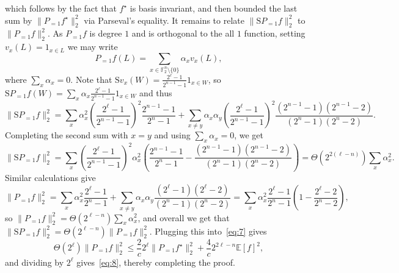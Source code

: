 \documentclass[11pt]{article}
\newcommand\E{\mathbb{E}}
\newcommand\norm[1]{\| #1 \|}
\renewcommand\leq{\leqslant}
\begin{document}
  which follows by the fact that $f^{\star}$ is basis invariant, and then bounded the last sum by $\norm{P_{=1}f^{\star}}_2^2$ via Parseval's equality. It remains to relate 
  $\norm{\mathrm{S} P_{=1} f}_2^2$ to 
  $\norm{P_{=1} f}_2^2$. As $P_{=1} f$ is degree $1$ and is orthogonal to the all $1$ function, setting $v_x(L) = 1_{x\in L}$ we may write
  \[
    P_{=1}f(L) = \sum\limits_{x\in\mathbb{F}_2^n\setminus\{0\}}\alpha_x v_x(L),
  \]
  where $\sum\limits_{x}\alpha_x=0$. Note that $\mathrm{S} v_x(W) = \frac{2^{\ell}-1}{2^{n-1}-1}1_{x\in W}$, so
  $\mathrm{S} P_{=1}f(W) = \sum\limits_{x} \alpha_x\frac{2^{\ell}-1}{2^{n-1}-1}1_{x\in W}$ and thus
  \[
  \norm{\mathrm{S} P_{=1}f}_2^2
  =\sum\limits_{x}\alpha_x^2\left(\frac{2^{\ell}-1}{2^{n-1}-1}\right)^2\frac{2^{n-1}-1}{2^{n}-1}
  +\sum\limits_{x\neq y}
  \alpha_x\alpha_y
  \left(\frac{2^{\ell}-1}{2^{n-1}-1}\right)^2\frac{(2^{n-1}-1)(2^{n-1}-2)}{(2^{n}-1)(2^n-2)}.
  \]
  Completing the second sum with $x=y$ and using $\sum_{x}\alpha_x=0$, we get
  \[
  \norm{\mathrm{S} P_{=1}f}_2^2
  =\sum\limits_{x}\left(\frac{2^{\ell}-1}{2^{n-1}-1}\right)^2\alpha_x^2
  \left(\frac{2^{n-1}-1}{2^{n}-1}
  -
  \frac{(2^{n-1}-1)(2^{n-1}-2)}{(2^{n}-1)(2^n-2)}\right)
  =\Theta(2^{2(\ell-n)})
  \sum\limits_{x}\alpha_x^2.
  \]
  Similar calculations give
  \[
  \norm{P_{=1}f}_2^2
  =\sum\limits_{x}\alpha_x^2\frac{2^{\ell}-1}{2^n-1}
  +\sum\limits_{x\neq y}\alpha_x\alpha_y
  \frac{(2^{\ell}-1)(2^{\ell}-2)}{(2^n-1)(2^n-2)}
  =\sum\limits_{x}\alpha_x^2\frac{2^{\ell}-1}{2^n-1}
  \left(1-\frac{2^{\ell}-2}{2^{n}-2}\right),
  \]
  so $\norm{P_{=1}f}_2^2=\Theta(2^{\ell-n})\sum\limits_{x}\alpha_x^2$, and overall we get that 
  $\norm{\mathrm{S}P_{=1}f}_2^2=\Theta(2^{\ell-n})\norm{P_{=1}f}_2^2$. Plugging this into~\eqref{eq:7} gives
  \[
  \Theta(2^{\ell})\norm{P_{=1}f}_2^2\leq \frac{2}{c}2^{\ell}\norm{P_{=1} f^{\star}}_2^2
  +\frac{4}{c}2^{2\ell-n}\E[f]^2,
  \]
  and dividing by $2^{\ell}$ gives~\eqref{eq:8}, thereby completing the proof.
\end{document}
